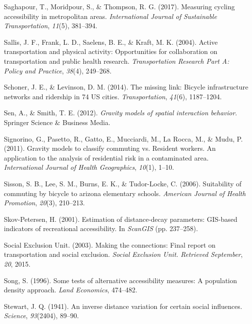 \documentclass[
11pt, %
oneside, %
english, %
singlespacing, %
]{macthesis} %
\newlength{\cslhangindent}
\newenvironment{CSLReferences}[2] %
{\begin{list}{}{%
	\setlength{\itemindent}{0pt}
	\setlength{\leftmargin}{0pt}
	\setlength{\parsep}{0pt}
	\ifodd #1
	\setlength{\leftmargin}{\cslhangindent}
	\setlength{\itemindent}{-1\cslhangindent}
	\fi
	\setlength{\itemsep}{#2\baselineskip}}}
{\end{list}}
\begin{document}
\begin{CSLReferences}{1}{0}
Saghapour, T., Moridpour, S., \& Thompson, R. G. (2017). Measuring cycling accessibility in metropolitan areas. \emph{International Journal of Sustainable Transportation}, \emph{11}(5), 381--394.

Sallis, J. F., Frank, L. D., Saelens, B. E., \& Kraft, M. K. (2004). Active transportation and physical activity: Opportunities for collaboration on transportation and public health research. \emph{Transportation Research Part A: Policy and Practice}, \emph{38}(4), 249--268.

Schoner, J. E., \& Levinson, D. M. (2014). The missing link: Bicycle infrastructure networks and ridership in 74 US cities. \emph{Transportation}, \emph{41}(6), 1187--1204.

Sen, A., \& Smith, T. E. (2012). \emph{Gravity models of spatial interaction behavior}. Springer Science \& Business Media.

Signorino, G., Pasetto, R., Gatto, E., Mucciardi, M., La Rocca, M., \& Mudu, P. (2011). Gravity models to classify commuting vs. Resident workers. An application to the analysis of residential risk in a contaminated area. \emph{International Journal of Health Geographics}, \emph{10}(1), 1--10.

Sisson, S. B., Lee, S. M., Burns, E. K., \& Tudor-Locke, C. (2006). Suitability of commuting by bicycle to arizona elementary schools. \emph{American Journal of Health Promotion}, \emph{20}(3), 210--213.

Skov-Petersen, H. (2001). Estimation of distance-decay parameters: GIS-based indicators of recreational accessibility. In \emph{ScanGIS} (pp. 237--258).

Social Exclusion Unit. (2003). Making the connections: Final report on transportation and social exclusion. \emph{Social Exclusion Unit. Retrieved September}, \emph{20}, 2015.

Song, S. (1996). Some tests of alternative accessibility measures: A population density approach. \emph{Land Economics}, 474--482.

Stewart, J. Q. (1941). An inverse distance variation for certain social influences. \emph{Science}, \emph{93}(2404), 89--90.


\end{CSLReferences}
\end{document}
